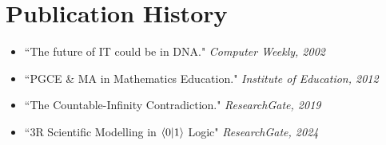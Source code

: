 \section*{Publication History}
\begin{itemize}
    \item \rDNA{} ``The future of IT could be in DNA." \textit{Computer Weekly, 2002}
    \item \rIoE{} ``PGCE \& MA in Mathematics Education." \textit{Institute of Education, 2012}
    \item \rCIC{} ``The Countable-Infinity Contradiction." \textit{ResearchGate, 2019}
    \item \rR{} ``3R Scientific Modelling in \(\langle 0 | 1 \rangle\) Logic" \textit{ResearchGate, 2024}
\end{itemize}
